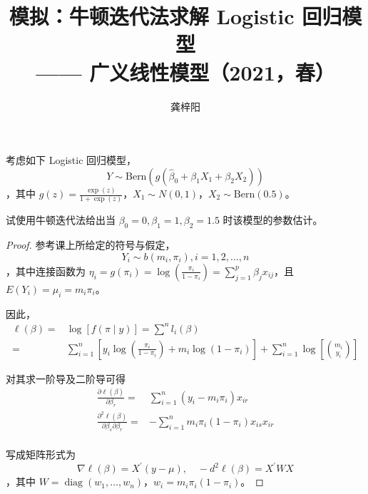 \documentclass[cn,mtpro2,12pt]{elegantpaper}
\title{模拟：牛顿迭代法求解 Logistic 回归模型 \\ ------ 广义线性模型（2021，春）}
\author{龚梓阳\quad 220071400021 \\ \email{meetziyang@outlook.com}}
\date{}
\begin{document}
\maketitle

考虑如下 Logistic 回归模型，
\begin{equation*}
    Y\sim\text{Bern}\left(g\left(\hat{\beta}_{0}+\beta_{1}X_{1}+\beta_{2}X_{2}\right)\right)
\end{equation*}
，其中 $g(z)=\frac{\exp(z)}{1+\exp(z)}$，$X_{1}\sim N(0,1)$，$X_{2}\sim\text{Bern}(0.5)$。

试使用牛顿迭代法给出当 $\beta_{0}=0,\beta_{1}=1,\beta_{2}=1.5$ 时该模型的参数估计。

\begin{proof}
    参考课上所给定的符号与假定，
    \begin{equation*}
        Y_{i}\sim b\left(m_{i},\pi_{i}\right),i=1,2,\ldots,n
    \end{equation*}
    ，其中连接函数为 $\eta_{i}=g\left(\pi_{i}\right)=\log\left(\frac{\pi_{i}}{1-\pi_{i}}\right)=\sum_{j=1}^{p}\beta_{j}x_{ij}$，且 $E(Y_{i})=\mu_{i}=m_{i}\pi_{i}$。

    因此，
    \begin{equation*}
        \begin{aligned}
            \ell(\beta)= & \log[f(\pi\mid y)]=\sum^{n}l_{i}(\beta)                                                                                                                        \\
            =            & \sum_{i=1}^{n}\left[y_{i}\log\left(\frac{\pi_{i}}{1-\pi_{i}}\right)+m_{i}\log\left(1-\pi_{i}\right)\right]+\sum_{i=1}^{n}\log\left[\binom{m_{i}}{y_{i}}\right]
        \end{aligned}
    \end{equation*}

    对其求一阶导及二阶导可得
    \begin{equation*}
        \begin{aligned}
            \frac{\partial\ell(\beta)}{\partial\beta_{r}}=                      & \sum_{i=1}^{n}\left(y_{i}-m_{i}\pi_{i}\right)x_{ir}           \\
            \frac{\partial^{2}\ell(\beta)}{\partial\beta_{s}\partial\beta_{r}}= & -\sum_{i=1}^{n}m_{i}\pi_{i}\left(1-\pi_{i}\right)x_{is}x_{ir} \\
        \end{aligned}
    \end{equation*}

    写成矩阵形式为
    \begin{equation*}
        \nabla\ell(\beta)=X^\prime(y-\mu),\quad -d^{2}\ell(\beta)=X^\prime WX
    \end{equation*}
    ，其中 $W=\operatorname{diag}\left(w_{1},\ldots,w_{n}\right)$，$w_{i}=m_{i}\pi_{i}\left(1-\pi_{i}\right)$。


\end{proof}
\end{document}
